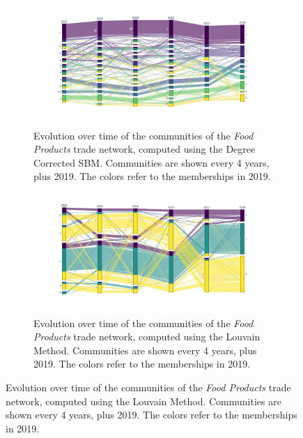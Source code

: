 \begin{figure}
    \centering
    \begin{subfigure}{\textwidth}
        \centering
        \includegraphics[width=\textwidth]{pics/dc_p10.png}
        \caption[Evolution over time of the communities of the \textit{Food Products} trade network, computed using the Degree Corrected SBM.]{Evolution over time of the communities of the \textit{Food Products} trade network, computed using the Degree Corrected SBM. Communities are shown every 4 years, plus 2019. The colors refer to the memberships in 2019.}
        \label{fig:dcfood}
    \end{subfigure}

    \begin{subfigure}{\textwidth}
        \centering
        \includegraphics[width=\textwidth]{pics/lou_p10.png}
        \caption[Evolution over time of the communities of the \textit{Food Products} trade network, computed using the Louvain Method.]{Evolution over time of the communities of the \textit{Food Products} trade network, computed using the Louvain Method. Communities are shown every 4 years, plus 2019. The colors refer to the memberships in 2019.}
        \label{fig:loufood}
    \end{subfigure}
\end{figure}


